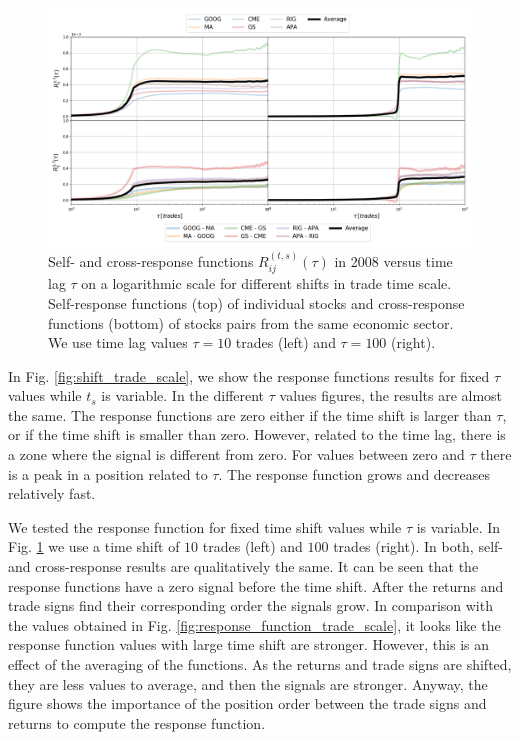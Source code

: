 \begin{figure}[htbp]
    \centering
    \includegraphics[width=\textwidth]{figures/04_shift_responses_trade.png}
    \caption{Self- and cross-response functions
             $R^{\left(t, s\right)}_{ij}\left(\tau\right)$ in 2008 versus time
             lag $\tau$ on a logarithmic scale for different shifts in trade
             time scale. Self-response functions (top) of individual stocks and
             cross-response functions (bottom) of stocks pairs from the same
             economic sector. We use time lag values $\tau=10$ trades (left)
             and $\tau=100$ (right).}
    \label{fig:shift_responses_trade_scale}
\end{figure}

In Fig. \ref{fig:shift_trade_scale}, we show the response functions results for
fixed $\tau$ values while $t_{s}$ is variable. In the different $\tau$ values
figures, the results are almost the same. The response functions are zero
either if the time shift is larger than $\tau$, or if the time shift is smaller
than zero. However, related to the time lag, there is a zone where the signal
is different from zero. For values between zero and $\tau$ there is a peak in a
position related to $\tau$. The response function grows and decreases
relatively fast.

We tested the response function for fixed time shift values while $\tau$ is
variable. In Fig. \ref{fig:shift_responses_trade_scale} we use a time shift of
$10$ trades (left) and $100$ trades (right). In both, self- and cross-response
results are qualitatively the same. It can be seen that the response functions
have a zero signal before the time shift. After the returns and trade signs
find their corresponding order the signals grow. In comparison with the values
obtained in Fig. \ref{fig:response_function_trade_scale}, it looks like the
response function values with large time shift are stronger. However, this is
an effect of the averaging of the functions. As the returns and trade signs are
shifted, they are less values to average, and then the signals are stronger.
Anyway, the figure shows the importance of the position order between the trade
signs and returns to compute the response function.

